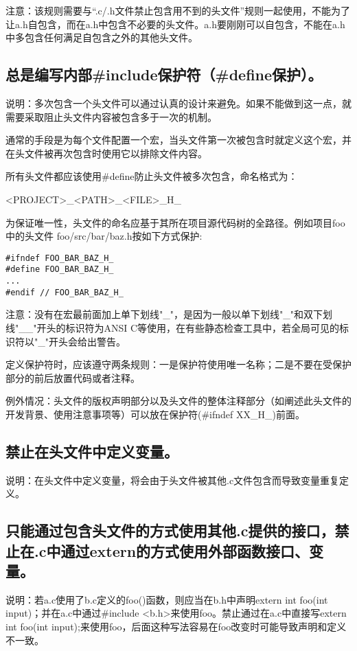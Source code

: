 注意：该规则需要与“.c/.h文件禁止包含用不到的头文件”规则一起使用，不能为了让a.h自包含，而在a.h中包含不必要的头文件。a.h要刚刚可以自包含，不能在a.h中多包含任何满足自包含之外的其他头文件。


\subsection{总是编写内部\#include保护符（\#define保护）。}
说明：多次包含一个头文件可以通过认真的设计来避免。如果不能做到这一点，就需要采取阻止头文件内容被包含多于一次的机制。

通常的手段是为每个文件配置一个宏，当头文件第一次被包含时就定义这个宏，并在头文件被再次包含时使用它以排除文件内容。

所有头文件都应该使用\#define防止头文件被多次包含，命名格式为：

<PROJECT>\_<PATH>\_<FILE>\_H\_

为保证唯一性，头文件的命名应基于其所在项目源代码树的全路径。例如项目foo中的头文件 foo/src/bar/baz.h按如下方式保护:
\begin{verbatim}
#ifndef FOO_BAR_BAZ_H_
#define FOO_BAR_BAZ_H_
...
#endif // FOO_BAR_BAZ_H_
\end{verbatim}

注意：没有在宏最前面加上单下划线"\_"，是因为一般以单下划线"\_"和双下划线"\_\_"开头的标识符为ANSI C等使用，在有些静态检查工具中，若全局可见的标识符以"\_"开头会给出警告。

定义保护符时，应该遵守两条规则：一是保护符使用唯一名称；二是不要在受保护部分的前后放置代码或者注释。

例外情况：头文件的版权声明部分以及头文件的整体注释部分（如阐述此头文件的开发背景、使用注意事项等）可以放在保护符(\#ifndef XX\_H\_)前面。


\subsection{禁止在头文件中定义变量。}
说明：在头文件中定义变量，将会由于头文件被其他.c文件包含而导致变量重复定义。


\subsection{只能通过包含头文件的方式使用其他.c提供的接口，禁止在.c中通过extern的方式使用外部函数接口、变量。}
说明：若a.c使用了b.c定义的foo()函数，则应当在b.h中声明extern int foo(int input)；并在a.c中通过\#include <b.h>来使用foo。禁止通过在a.c中直接写extern int foo(int input);来使用foo，后面这种写法容易在foo改变时可能导致声明和定义不一致。


